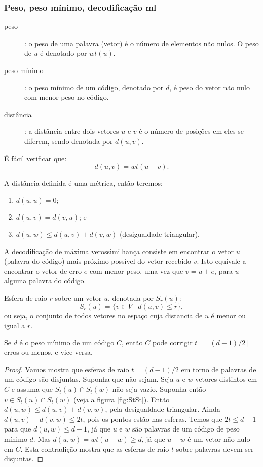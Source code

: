 \begin{frame}[allowframebreaks]
    \frametitle{Peso, peso mínimo, decodificação ml}

    \begin{description}
	\item[peso]: o peso de uma palavra (vetor) é o número de elementos não nulos. O peso de $u$ é denotado por $wt(u)$.
	\item[peso mínimo]: o peso mínimo de um código, denotado por $d$, é peso do vetor não nulo com menor peso no código.
	\item[distância]: a distância entre dois vetores $u$ e $v$ é o número de posições em eles se diferem, sendo denotada por $d(u,v)$.
    \end{description}
    É fácil verificar que:
    \begin{equation}
	d(u,v) = wt(u - v).
    \end{equation}

    A distância definida é uma métrica, então teremos:
    \begin{enumerate}
	\item $d(u,u) = 0$;
	\item $d(u,v) = d(v,u)$; e
	\item $d(u,w) \leq d(u,v) + d(v,w)$ (desigualdade triangular).
    \end{enumerate}


     A decodificação de máxima verossimilhança consiste em encontrar o vetor $u$ (palavra do código)
     mais próximo possível do vetor recebido $v$. Isto equivale a encontrar o vetor de erro $e$ com
     menor peso, uma vez que $v = u + e$, para $u$ alguma palavra do código.


     Esfera de raio $r$ sobre um vetor $u$, denotada por $S_r(u)$:
     \begin{equation}
     S_r(u) = \{v \in V \mid d(u,v) \leq r\} ,
     \end{equation}
     ou seja, o conjunto de todos vetores no espaço cuja distancia de $u$ é menor ou igual a $r$.


     \begin{theorem}
	 Se $d$ é o peso mínimo de um código $C$, então $C$ pode corrigir
	 $t = \lfloor (d-1)/2 \rfloor$ erros ou menos, e vice-versa.
     \end{theorem}
     \begin{proof}
	 Vamos mostra que esferas de raio $t=(d-1)/2$ em torno de palavras de um código são disjuntas.
	 Suponha que não sejam. Seja $u$ e $w$ vetores distintos em $C$ e assuma que $S_t(u) \cap S_t(w)$
	 não seja vazio. Suponha então $v \in S_t(u) \cap S_t(w)$ (veja a figura \ref{fig:StSt}). Então 
	 $d(u,w) \leq d(u,v) + d(v,w)$, pela desigualdade triangular. Ainda $d(u,v) + d(v,w) \leq 2t$,
	 pois os pontos estão nas esferas. Temos que $2t \leq d-1$ para que $d(u,w) \leq d-1$, já que
	 $u$ e $w$ são palavras de um código de peso mínimo $d$.
	 Mas $d(u,w) = wt(u-w) \geq d$, já que $u-w$ é um vetor não nulo em $C$.
	 Esta contradição mostra que as esferas de raio $t$ sobre palavras devem ser disjuntas.


\end{proof}
\end{frame}
